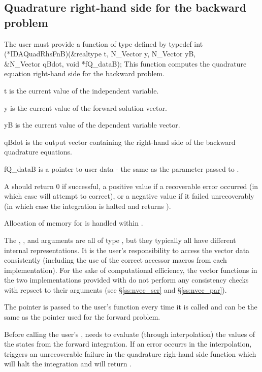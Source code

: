 \subsection{Quadrature right-hand side for the backward problem}
The user must provide a function of type  defined by
{
  typedef int (*IDAQuadRhsFnB)(&realtype t, N\_Vector y, N\_Vector yB, \\
                              &N\_Vector qBdot, void *fQ\_dataB);
}
{
  This function computes the quadrature equation right-hand side for the
  backward problem.
}
{
  \begin{args}[fQ\_dataB]
  \item[t]
    is the current value of the independent variable.
  \item[y]
    is the current value of the forward solution vector.
  \item[yB]
    is the current value of the dependent variable vector.
  \item[qBdot]
    is the output vector containing the right-hand side of the backward quadrature
    equations.
  \item[fQ\_dataB]
    is a pointer to user data - the same as the       
    parameter passed to .   
  \end{args}
}
{
  A  should return 0 if successful, a positive value if a recoverable
  error occurred (in which case {\idas} will attempt to correct), or a negative 
  value if it failed unrecoverably (in which case the integration is halted and
   returns ).
}
{
  Allocation of memory for  is handled within {\idas}.

  The , , and  arguments are all of type ,
  but they  typically all have different internal representations. It is the user's 
  responsibility to access the vector data consistently (including the use of the 
  correct accessor macros from each {\nvector} implementation). For the sake of 
  computational efficiency, the vector functions in the two {\nvector} implementations 
  provided with {\idas} do not perform any consistency checks with repsect to their 
   arguments (see \S\ref{ss:nvec_ser} and \S\ref{ss:nvec_par}).

  The  pointer is passed to the user's  function every time 
  it is called and can be the same as the  pointer used for the forward problem.

  {\warn}Before calling the user's , {\idaa} needs to evaluate
  (through interpolation) the values of the states from the forward integration. 
  If an error occurrs in the interpolation, {\idaa} triggers an unrecoverable
  failure in the quadrature righ-hand side function which will halt the integration and
   will return .
}


